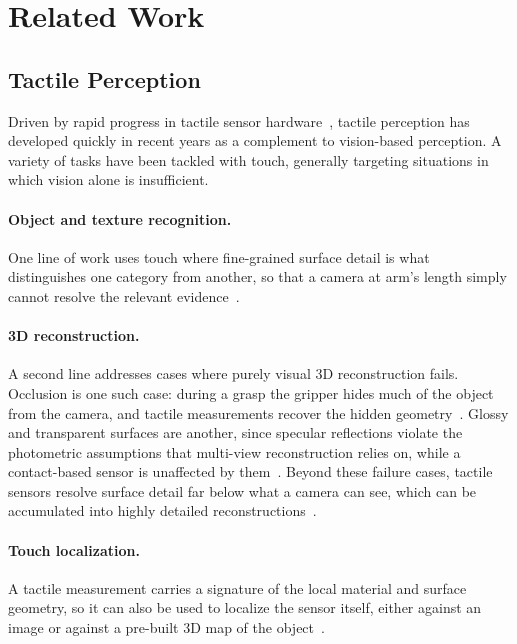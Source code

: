 \section{Related Work}
\label{sec:related}

\subsection{Tactile Perception}

Driven by rapid progress in tactile sensor hardware~\cite{gelsight}, tactile perception has
developed quickly in recent years as a complement to vision-based perception. A variety of tasks
have been tackled with touch, generally targeting situations in which vision alone is
insufficient.

\paragraph{Object and texture recognition.}
One line of work uses touch where fine-grained surface detail is what distinguishes one category
from another, so that a camera at arm's length simply cannot resolve the relevant
evidence~\cite{textureuneven,glovetactile,triboelectrictactile,bagoffeatures,dotsim}.

\paragraph{3D reconstruction.}
A second line addresses cases where purely visual 3D reconstruction fails. Occlusion is one such
case: during a grasp the gripper hides much of the object from the camera, and tactile
measurements recover the hidden geometry~\cite{neuralfeels,touchsdf}. Glossy and transparent
surfaces are another, since specular reflections violate the photometric assumptions that
multi-view reconstruction relies on, while a contact-based sensor is unaffected by
them~\cite{snaptapsplat,splattouch,touchgs}. Beyond these failure cases, tactile sensors resolve
surface detail far below what a camera can see, which can be accumulated into highly detailed
reconstructions~\cite{gelslam}.

\paragraph{Touch localization.}
A tactile measurement carries a signature of the local material and surface geometry, so it
can also be used to localize the sensor itself, either against an image or against a pre-built
3D map of the object~\cite{tacloc,splattouch,normalflow}.

